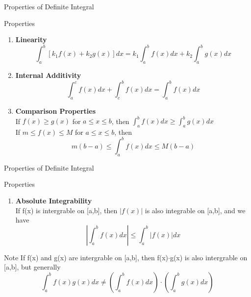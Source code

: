 \documentclass{beamer}
\begin{document}
\begin{frame}{Properties of Definite Integral}
    \begin{block}{Properties}
        \begin{enumerate}
            \item \textbf{Linearity} 
            \begin{equation*}
                \int_a^b [k_1f(x)+k_2g(x)]dx = k_1\int_a^b f(x)dx + k_2\int_a^b g(x)dx
            \end{equation*} 
            \item \textbf{Internal Additivity} 
            \begin{equation*}
                \int_a^c f(x)dx + \int_c^b f(x)dx = \int_a^b f(x)dx
            \end{equation*}
            \item \textbf{Comparison Properties} \\
            If $f(x) \geq g(x)$ for $a \leq x \leq b$, then $\int_a^b f(x)dx \geq \int_a^b g(x)dx$ \\
            If $m\leq f(x) \leq M$ for $a \leq x \leq b$, then
            \begin{equation*}
            m(b-a) \leq \int_a^b f(x)dx \leq M(b-a)              
            \end{equation*}
        \end{enumerate}
    \end{block}
    
\end{frame}

\begin{frame}{Properties of Definite Integral}
    \begin{block}{Properties}
        \begin{enumerate}[4]
            \item \textbf{Absolute Integrability}\\
            If f(x) is intergrable on [a,b], then $|f(x)|$ is also integrable on [a,b], and we have 
            \begin{equation*}
                |\int_a^b f(x) dx | \leq \int_a^b |f(x)|dx
            \end{equation*}
        \end{enumerate}
    \end{block}
    \begin{block}{Note}
        If f(x) and g(x) are intergrable on [a,b], then f(x)$\cdot$g(x) is also intergrable on [a,b], but generally
        \begin{equation*}
            \int_a^b f(x)g(x)dx \neq (\int_a^b f(x)dx) \cdot (\int_a^b g(x)dx)
        \end{equation*}
    \end{block}
\end{frame}
\end{document}
